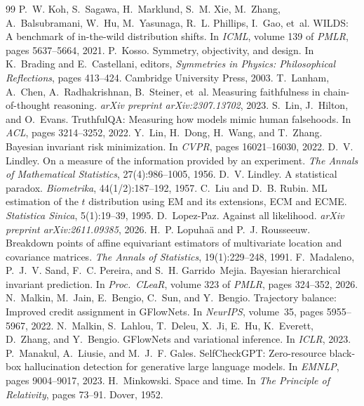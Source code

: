 \documentclass[11pt,a4paper]{article}
\theoremstyle{definition}
\theoremstyle{remark}
\begin{document}
\begin{thebibliography}{99}
 P.~W. Koh, S.~Sagawa, H.~Marklund, S.~M. Xie, M.~Zhang, A.~Balsubramani, W.~Hu, M.~Yasunaga, R.~L. Phillips, I.~Gao, et~al. {WILDS}: A benchmark of in-the-wild distribution shifts. In \emph{ICML}, volume 139 of \emph{PMLR}, pages 5637--5664, 2021.
 P.~Kosso. Symmetry, objectivity, and design. In K.~Brading and E.~Castellani, editors, \emph{Symmetries in Physics: Philosophical Reflections}, pages 413--424. Cambridge University Press, 2003.
 T.~Lanham, A.~Chen, A.~Radhakrishnan, B.~Steiner, et~al. Measuring faithfulness in chain-of-thought reasoning. \emph{arXiv preprint arXiv:2307.13702}, 2023.
 S.~Lin, J.~Hilton, and O.~Evans. {TruthfulQA}: Measuring how models mimic human falsehoods. In \emph{ACL}, pages 3214--3252, 2022.
 Y.~Lin, H.~Dong, H.~Wang, and T.~Zhang. Bayesian invariant risk minimization. In \emph{CVPR}, pages 16021--16030, 2022.
 D.~V. Lindley. On a measure of the information provided by an experiment. \emph{The Annals of Mathematical Statistics}, 27(4):986--1005, 1956.
 D.~V. Lindley. A statistical paradox. \emph{Biometrika}, 44(1/2):187--192, 1957.
 C.~Liu and D.~B. Rubin. {ML} estimation of the $t$ distribution using {EM} and its extensions, {ECM} and {ECME}. \emph{Statistica Sinica}, 5(1):19--39, 1995.
 D.~Lopez-Paz. Against all likelihood. \emph{arXiv preprint arXiv:2611.09385}, 2026.
 H.~P. Lopuha\"a and P.~J. Rousseeuw. Breakdown points of affine equivariant estimators of multivariate location and covariance matrices. \emph{The Annals of Statistics}, 19(1):229--248, 1991.
 F.~Madaleno, P.~J.~V. Sand, F.~C. Pereira, and S.~H. Garrido~Mejia. Bayesian hierarchical invariant prediction. In \emph{Proc.\ CLeaR}, volume 323 of \emph{PMLR}, pages 324--352, 2026.
 N.~Malkin, M.~Jain, E.~Bengio, C.~Sun, and Y.~Bengio. Trajectory balance: Improved credit assignment in {GFlowNets}. In \emph{NeurIPS}, volume~35, pages 5955--5967, 2022.
 N.~Malkin, S.~Lahlou, T.~Deleu, X.~Ji, E.~Hu, K.~Everett, D.~Zhang, and Y.~Bengio. {GFlowNets} and variational inference. In \emph{ICLR}, 2023.
 P.~Manakul, A.~Liusie, and M.~J.~F. Gales. {SelfCheckGPT}: Zero-resource black-box hallucination detection for generative large language models. In \emph{EMNLP}, pages 9004--9017, 2023.
 H.~Minkowski. Space and time. In \emph{The Principle of Relativity}, pages 73--91. Dover, 1952.

\end{thebibliography}
\end{document}
